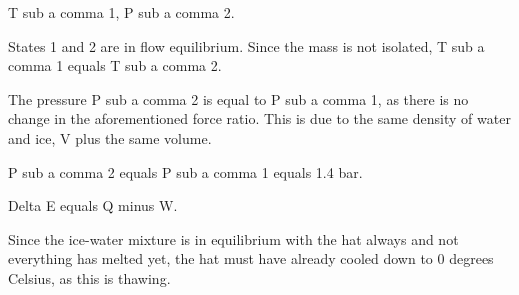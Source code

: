 T sub a comma 1, P sub a comma 2.

States 1 and 2 are in flow equilibrium. Since the mass is not isolated, T sub a comma 1 equals T sub a comma 2.

The pressure P sub a comma 2 is equal to P sub a comma 1, as there is no change in the aforementioned force ratio. This is due to the same density of water and ice, V plus the same volume.

P sub a comma 2 equals P sub a comma 1 equals 1.4 bar.

Delta E equals Q minus W.

Since the ice-water mixture is in equilibrium with the hat always and not everything has melted yet, the hat must have already cooled down to 0 degrees Celsius, as this is thawing.